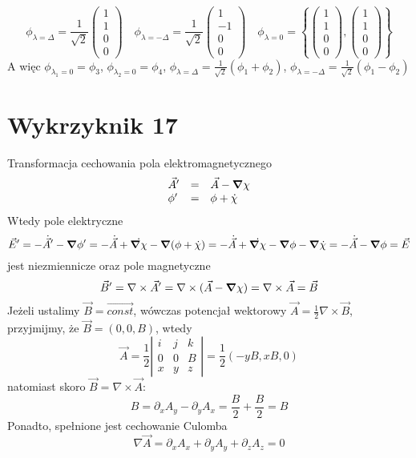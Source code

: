 \documentclass[a4paper,12pt]{article}
\begin{document}
\begin{equation*}
  \phi_{\lambda=\Delta} = \frac{1}{\sqrt{2}}\begin{pmatrix} 1 \\ 1 \\ 0 \\ 0 \end{pmatrix}\quad
  \phi_{\lambda = -\Delta} = \frac{1}{\sqrt{2}}\begin{pmatrix} 1 \\ -1 \\ 0 \\ 0 \end{pmatrix}\quad
  \phi_{\lambda = 0} = \left\{\begin{pmatrix}1 \\ 1 \\ 0 \\
    0\end{pmatrix},\begin{pmatrix}1 \\ 1 \\ 0 \\ 0\end{pmatrix} \right\}
\end{equation*}
A więc $\phi_{\lambda_1=0} = \phi_3$, $\phi_{\lambda_2=0} = \phi_4$,
$\phi_{\lambda=\Delta} = \frac{1}{\sqrt{2}}\left( \phi_1 + \phi_2 \right)$,
$\phi_{\lambda=-\Delta} = \frac{1}{\sqrt{2}}\left( \phi_1 - \phi_2 \right)$

\section{Wykrzyknik 17}
	Transformacja cechowania pola elektromagnetycznego
	$$
	\begin{array}{lll}
		\vec{A}' &=& \vec{A}-\grad{\chi} \\
		\phi' &=& \phi+\dot{\chi}
	\end{array}
	$$
	Wtedy pole elektryczne
	$$
		\vec{E}' = -\dot{\vec{A}}'-\grad{\phi}' = -\dot{\vec{A}}+\dot{\grad{\chi}} - \grad{(\phi+\dot{\chi})} = -\dot{\vec{A}}+\dot{\grad{\chi}} - \grad{\phi} - \grad{\dot{\chi}} = -\dot{\vec{A}} - \grad{\phi} = \vec{E}
	$$
	jest niezmiennicze oraz pole magnetyczne
	$$
		\vec{B}' = \nabla\times\vec{A}' = \nabla\times(\vec{A}-\grad{\chi}) = \nabla\times\vec{A} = \vec{B}
	$$
	Jeżeli ustalimy $\vec{B}=\vec{const}$, wówczas potencjał wektorowy $\vec{A} = \frac{1}{2} \nabla \times \vec{B}$, przyjmijmy, że $\vec{B} = (0,0,B)$, wtedy
	$$
		\vec{A} = \frac{1}{2}\left|
			\begin{array}{ccc}
				i & j & k \\
				0 & 0 & B \\
				x & y & z 
			\end{array}\right| = \frac{1}{2}(-yB,xB,0)
	$$
	natomiast skoro $\vec{B} = \nabla\times\vec{A}$:
	$$
		B = \partial_x A_y - \partial_y A_x =\frac{B}{2}+\frac{B}{2} = B
	$$
	Ponadto, spełnione jest cechowanie Culomba
	$$
		\nabla\vec{A} =\partial_x A_x + \partial_y A_y + \partial_z A_z = 0
	$$
\end{document}
